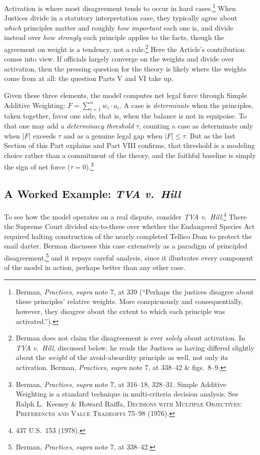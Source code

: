 Activation is where most disagreement tends to occur in hard
cases.\footnote{Berman, \textit{Practices}, \textit{supra} note 7, at 339 (``Perhaps the justices disagree about these
principles' relative weights. More conspicuously and consequentially,
however, they disagree about the extent to which each principle was
activated.'').} When Justices divide in a statutory interpretation case,
they typically agree about \textit{which} principles matter and roughly
\textit{how important} each one is, and divide instead over \textit{how
strongly} each principle applies to the facts, though the agreement on
weight is a tendency, not a rule.\footnote{Berman does not claim the
disagreement is ever \textit{solely} about activation. In \textit{TVA v.\
Hill}, discussed below, he reads the Justices as having differed slightly
about the \textit{weight} of the avoid-absurdity principle as well, not
only its activation. Berman, \textit{Practices}, \textit{supra} note 7, at 338--42 \& figs.\ 8--9.} Here the Article's contribution comes into view. If officials largely
converge on the weights and divide over activation, then the pressing
question for the theory is likely where the weights come from at all: the
question Parts V and VI take up.

Given these three elements, the model computes net legal force through
Simple Additive Weighting: $F = \sum_{i=1}^{n} w_i \cdot a_i$. A case is
\textit{determinate} when the principles, taken together, favor one
side, that is, when the balance is not in equipoise. To that one may add a
\textit{determinacy threshold} $\tau$, counting a case as determinate only
when $|F|$ exceeds $\tau$ and as a genuine legal gap when $|F| \leq \tau$.
But as the last Section of this Part explains and Part VIII confirms, that
threshold is a modeling choice rather than a commitment of the theory, and the faithful
baseline is simply the sign of net force ($\tau = 0$).\footnote{Berman, \textit{Practices}, \textit{supra} note 7, at 316--18, 328--31. Simple Additive Weighting is a standard technique in
multi-criteria decision analysis. See Ralph L.\ Keeney \& Howard Raiffa,
\textsc{Decisions with Multiple Objectives: Preferences and Value
Tradeoffs} 75--98 (1976).}

\subsection{A Worked Example: \textit{TVA v.\ Hill}}

To see how the model operates on a real dispute, consider \textit{TVA v.\
Hill}.\footnote{437 U.S.\ 153 (1978).} There the Supreme Court divided
six-to-three over whether the Endangered Species Act required halting
construction of the nearly completed Tellico Dam to protect the snail
darter. Berman discusses this case extensively as a paradigm of principled
disagreement,\footnote{Berman, \textit{Practices}, \textit{supra} note 7, at
338--42.} and it repays careful analysis, since it illustrates every component
of the model in action, perhaps better than any other case.

